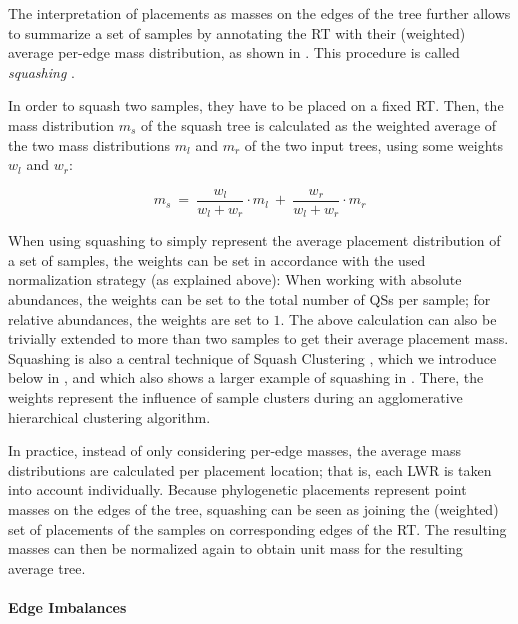 The interpretation of placements as masses on the edges of the tree further allows to summarize a set of samples
by annotating the \ac{RT} with their (weighted) average per-edge mass distribution, as shown in .
This procedure is called \emph{squashing} \cite{Matsen2011a}.

In order to squash two samples, they have to be placed on a fixed \ac{RT}.
Then, the mass distribution $m_s$ of the squash tree is calculated as
the weighted average of the two mass distributions $m_l$ and $m_r$ of the two input trees,
using some weights $w_l$ and $w_r$:

\begin{equation}
    \label{ch:Foundations:sec:PhylogeneticPlacement:eq:Squashing}
    m_s ~=~ \frac{w_l}{w_l + w_r} \cdot m_l ~+~ \frac{w_r}{w_l + w_r} \cdot m_r
\end{equation}

When using squashing to simply represent the average placement distribution of a set of samples,
the weights can be set in accordance with the used normalization strategy (as explained above):
When working with absolute abundances, the weights can be set to the total number of \acp{QS} per sample;
for relative abundances, the weights are set to $1$.
The above calculation can also be trivially extended to more than two samples to get their average placement mass.
Squashing is also a central technique of Squash Clustering \cite{Matsen2011a}, which we introduce below in
,
and which also shows a larger example of squashing in .
There, the weights represent the influence of sample clusters during an agglomerative hierarchical clustering algorithm.

In practice, instead of only considering per-edge masses,
the average mass distributions are calculated per placement location;
that is, each \ac{LWR} is taken into account individually.
Because phylogenetic placements represent point masses on the edges of the tree,
squashing can be seen as joining the (weighted) set of placements of the samples on corresponding edges of the \ac{RT}.
The resulting masses can then be normalized again to obtain unit mass for the resulting average tree.

\paragraph{Edge Imbalances}
\label{ch:Foundations:sec:PhylogeneticPlacement:sub:PlacementProcessing:par:EdgeImbalances}

